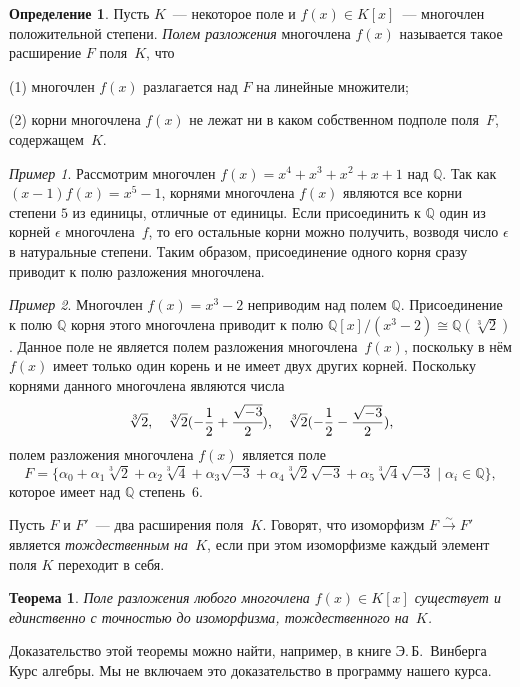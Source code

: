 \documentclass[a4paper,10pt]{amsart}
\def\QQ{{\mathbb Q}}%
\newtheorem{theorem}{Теорема}
\theoremstyle{definition}
\newtheorem{definition}{Определение}
\theoremstyle{remark}
\newtheorem{example}{Пример}
\begin{document}
\begin{definition}
Пусть $K$~--- некоторое поле и $f(x)\in K[x]$~--- многочлен
положительной степени. {\it Полем разложения} многочлена $f(x)$
называется такое расширение $F$ поля~$K$, что

(1) многочлен $f(x)$ разлагается над $F$ на линейные множители;

(2) корни многочлена $f(x)$ не лежат ни в каком собственном подполе
поля~$F$, содержащем~$K$.
\end{definition}

\begin{example}
Рассмотрим многочлен $f(x) = x^4+x^3+x^2+x+1$ над $\QQ$. Так как
$(x-1)f(x) = x^5-1$, корнями многочлена $f(x)$ являются все корни
степени $5$ из единицы, отличные от единицы. Если присоединить к
$\QQ$ один из корней $\epsilon$ многочлена~$f$, то его остальные
корни можно получить, возводя число $\epsilon$ в натуральные
степени. Таким образом, присоединение одного корня сразу приводит к
полю разложения многочлена.
\end{example}


\begin{example}
Многочлен $f(x)=x^3-2$ неприводим над полем $\QQ$. Присоединение к
полю $\QQ$ корня этого многочлена приводит к полю $\QQ[x]/(x^3-2)
\cong \QQ(\sqrt[3]{2})$. Данное поле не является полем разложения
многочлена~$f(x)$, поскольку в нём $f(x)$ имеет только один корень и
не имеет двух других корней. Поскольку корнями данного многочлена
являются числа
$$
\sqrt[3]{2}, \quad \sqrt[3]{2}(-\frac{1}{2} + \cfrac{\sqrt{-3}}{2}),
\quad \sqrt[3]{2}(-\frac{1}{2} - \frac{\sqrt{-3}}{2}),
$$
полем разложения многочлена $f(x)$ является поле
$$
F = \{\alpha_0 + \alpha_1 \sqrt[3]{2} + \alpha_2 \sqrt[3]{4} +
\alpha_3 \sqrt{-3} + \alpha_4 \sqrt[3]{2} \sqrt{-3} + \alpha_5
\sqrt[3]{4} \sqrt{-3} \mid \alpha_i \in \QQ\},
$$
которое имеет над $\QQ$ степень~$6$.
\end{example}

Пусть $F$ и $F'$~--- два расширения поля~$K$. Говорят, что
изоморфизм $F \xrightarrow{\sim} F'$ является \textit{тождественным
на~$K$}, если при этом изоморфизме каждый элемент поля $K$ переходит
в себя.

\begin{theorem}
Поле разложения любого многочлена $f(x) \in K[x]$ существует и
единственно с точностью до изоморфизма, тождественного на~$K$.
\end{theorem}

Доказательство этой теоремы можно найти, например, в книге
Э.\,Б.~Винберга \guillemotleft Курс алгебры\guillemotright{}. Мы не
включаем это доказательство в программу нашего курса.
\end{document}
